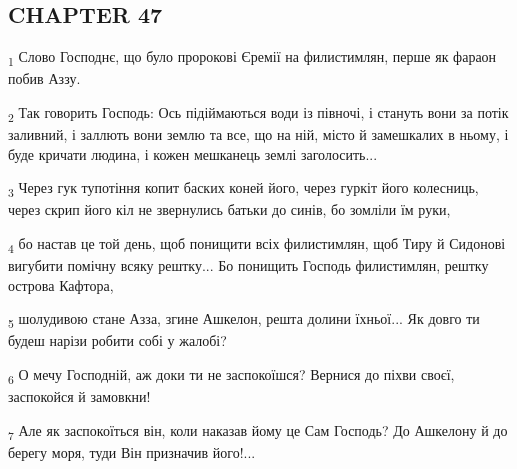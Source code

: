 \subsection{CHAPTER 47}
\begin{tcolorbox}
\textsubscript{1} Слово Господнє, що було пророкові Єремії на филистимлян, перше як фараон побив Аззу.
\end{tcolorbox}
\begin{tcolorbox}
\textsubscript{2} Так говорить Господь: Ось підіймаються води із півночі, і стануть вони за потік заливний, і заллють вони землю та все, що на ній, місто й замешкалих в ньому, і буде кричати людина, і кожен мешканець землі заголосить...
\end{tcolorbox}
\begin{tcolorbox}
\textsubscript{3} Через гук тупотіння копит баских коней його, через гуркіт його колесниць, через скрип його кіл не звернулись батьки до синів, бо зомліли їм руки,
\end{tcolorbox}
\begin{tcolorbox}
\textsubscript{4} бо настав це той день, щоб понищити всіх филистимлян, щоб Тиру й Сидонові вигубити помічну всяку рештку... Бо понищить Господь филистимлян, рештку острова Кафтора,
\end{tcolorbox}
\begin{tcolorbox}
\textsubscript{5} шолудивою стане Азза, згине Ашкелон, решта долини їхньої... Як довго ти будеш нарізи робити собі у жалобі?
\end{tcolorbox}
\begin{tcolorbox}
\textsubscript{6} О мечу Господній, аж доки ти не заспокоїшся? Вернися до піхви своєї, заспокойся й замовкни!
\end{tcolorbox}
\begin{tcolorbox}
\textsubscript{7} Але як заспокоїться він, коли наказав йому це Сам Господь? До Ашкелону й до берегу моря, туди Він призначив його!...
\end{tcolorbox}
